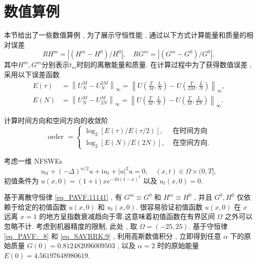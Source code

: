 \section{数值算例}\label{Section_PAVF: 4}

本节给出了一些数值算例 , 为了展示守恒性能 , 通过以下方式计算能量和质量的相对误差
\begin{equation}\label{eq_PAVF:105}
R H^{m}=\left|\left(H^{m}-H^{0}\right) / H^{0}\right| , \quad R G^{m}=\left|\left(G^{m}-G^{0}\right) / G^{0}\right| , 
\end{equation}
其中$H^{m} , G^{m}$分别表示$t_{m}$时刻的离散能量和质量.
在计算过程中为了获得数值误差 , 采用以下误差函数
\begin{align}\label{eq_PAVF:103}
E(\tau)&=\left\|U_{N}^{M}-U_{N}^{2 M}\right\|_{\infty}=\left\|U\left(\frac{T}{M} , \frac{L}{N}\right)-U\left(\frac{T}{2 M} , \frac{L}{N}\right)\right\|_{\infty} , \nonumber\\
E(N)&=\left\|U_{N}^{M}-U_{2 N}^{M}\right\|_{\infty}=\left\|U\left(\frac{T}{M} , \frac{L}{N}\right)-U\left(\frac{T}{M} , \frac{L}{2 N}\right)\right\|_{\infty}.
\end{align}

计算时间方向和空间方向的收敛阶
\begin{equation}
\text { order }= \left\{
\begin{aligned}
\log _{2}[E(\tau) / E(\tau / 2)] , & \text { 在时间方向 } \\
\log _{2}[E(N) / E(2 N)] , & \text { 在空间方向.}
\end{aligned}\right.\label{eq_PAVF:104}
\end{equation}

\begin{example}\label{exp_PAVF:2}
	考虑一维 NFSWEs
	\begin{equation}\label{eq_PAVF:108}
	u_{t t}+(-\Delta)^{\alpha / 2} u+\mathrm{i}u_t+|u|^2 u=0 , \quad (x , t)\in  \Omega\times(0 , T] , 
	\end{equation}
	初值条件为 $u(x , 0)=(1+\mathrm{i}) x e^{-10(1-x)^2}$ 以及 $u_t(x , 0)=0$.
\end{example}

	基于离散守恒律 \eqref{eq_PAVF:11141} , 有 $G^{m}\equiv G^0$ 和 $H^{m}\equiv H^0$ , 并且 $G^0 , H^0$ 仅依赖于给定的初值函数 $u(x , 0)$ 和 $u_t(x , 0)$.
	很容易验证初值函数 $u(x , 0)$ 在 $x$ 远离 $x=1$ 的地方呈指数衰减趋向于零.这意味着初值函数在有界区间 $\Omega$ 之外可以忽略不计.
	考虑到机器精度的限制, 此处 , 取 $\Omega=(-25 , 25)$.
	基于守恒律 \eqref{eq_PAVF:_8} 和 \eqref{eq_SAVRRK:9} , 利用高斯数值积分 , 立即得到任意 $\alpha$ 下的原始质量 $G(0)=0.812482096009503$ , 以及 $\alpha=2$ 时的原始能量 $E(0)=4.56197648980619$.

